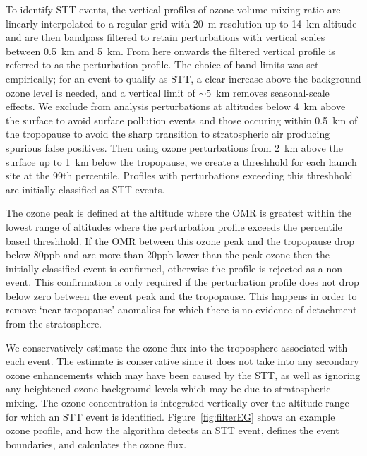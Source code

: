 \documentclass{article}
\begin{document}
    To identify STT events, the vertical profiles of ozone volume mixing ratio are linearly interpolated to a regular grid with 20~m resolution up to 14~km altitude and are then bandpass filtered to retain perturbations with vertical scales between 0.5~km and 5~km.
    From here onwards the filtered vertical profile is referred to as the perturbation profile.
    The choice of band limits was set empirically; for an event to qualify as STT, a clear increase above the background ozone level is needed, and a vertical limit of $\sim 5$~km removes seasonal-scale effects.
    We exclude from analysis perturbations at altitudes below 4~km above the surface to avoid surface pollution events and those occuring within 0.5~km of the tropopause to avoid the sharp transition to stratospheric air producing spurious false positives.
    Then using ozone perturbations from 2~km above the surface up to 1~km below the tropopause, we create a threshhold for each launch site at the 99th percentile.
    Profiles with perturbations exceeding this threshhold are initially classified as STT events.
    
    The ozone peak is defined at the altitude where the OMR is greatest within the lowest range of altitudes where the perturbation profile exceeds the percentile based threshhold.
    If the OMR between this ozone peak and the tropopause drop below 80ppb and are more than 20ppb lower than the peak ozone then the initially classified event is confirmed, otherwise the profile is rejected as a non-event.
    This confirmation is only required if the perturbation profile does not drop below zero between the event peak and the tropopause.
    This happens in order to remove `near tropopause' anomalies for which there is no evidence of detachment from the stratosphere.

    We conservatively estimate the ozone flux into the troposphere associated with each event.
    The estimate is conservative since it does not take into any secondary ozone enhancements which may have been caused by the STT, as well as ignoring any heightened ozone background levels which may be due to stratospheric mixing.
    The ozone concentration is integrated vertically over the altitude range for which an STT event is identified.
    Figure~\ref{fig:filterEG} shows an example ozone profile, and how the algorithm detects an STT event, defines the event boundaries, and calculates the ozone flux.
      
\end{document}
